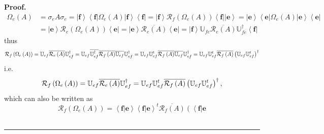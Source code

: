 \documentclass[aps,preprint]{revtex4}
\newenvironment{proof}[1][Proof]{\noindent\textbf{#1.} }{\ \rule{0.5em}{0.5em}}
\begin{document}
\begin{proof}
\begin{align}
\Omega_{e}\left( A\right) & =\sigma_{e}A\sigma_{e}=\left\vert \mathbf{f}%
\right\rangle \left\langle \mathbf{f}\right\vert \Omega_{e}\left( A\right)
\left\vert \mathbf{f}\right\rangle \left\langle \mathbf{f}\right\vert
=\left\vert \mathbf{f}\right\rangle \mathcal{R}_{f}\left( \Omega_{e}\left(
A\right) \right) \left\langle \mathbf{f}\right\vert \left\vert \mathbf{e}%
\right\rangle =\left\vert \mathbf{e}\right\rangle \left\langle \mathbf{e}%
\right\vert \Omega_{e}\left( A\right) \left\vert \mathbf{e}\right\rangle
\left\langle \mathbf{e}\right\vert \\
& =\left\vert \mathbf{e}\right\rangle \mathcal{R}_{e}\left( \Omega
_{e}\left( A\right) \right) \left\langle \mathbf{e}\right\vert =\left\vert 
\mathbf{e}\right\rangle \overline{\mathcal{R}_{e}\left( A\right) }%
\left\langle \mathbf{e}\right\vert =\left\vert \mathbf{f}\right\rangle 
\mathbb{U}_{fe}\overline{\mathcal{R}_{e}\left( A\right) }\mathbb{U}%
_{fe}^{\dagger}\left\langle \mathbf{f}\right\vert
\end{align}
thus 
\begin{equation}
\mathcal{R}_{f}\left( \Omega_{e}\left( A\right) \right) =\mathbb{U}_{ef}%
\overline{\mathcal{R}_{e}\left( A\right) }\mathbb{U}_{ef}^{\dagger }=\mathbb{%
U}_{ef}\overline{\mathbb{U}_{ef}^{\dagger}}\overline{\mathcal{R}_{f}\left(
A\right) }\overline{\mathbb{U}_{ef}}\mathbb{U}_{ef}^{\dagger }=\mathbb{U}%
_{ef}\mathbb{U}_{ef}^{t}\overline{\mathcal{R}_{f}\left( A\right) }\overline{%
\mathbb{U}_{ef}}\mathbb{U}_{ef}^{\dagger}=\mathbb{U}_{ef}\mathbb{U}_{ef}^{t}%
\overline{\mathcal{R}_{f}\left( A\right) }\left( \mathbb{U}_{ef}\mathbb{U}%
_{ef}^{t}\right) ^{\dagger}
\end{equation}
i.e. 
\begin{equation}
\mathcal{R}_{f}\left( \Omega_{e}\left( A\right) \right) =\mathbb{U}_{ef}%
\overline{\mathcal{R}_{e}\left( A\right) }\mathbb{U}_{ef}^{\dagger }=\mathbb{%
U}_{ef}\mathbb{U}_{ef}^{t}\overline{\mathcal{R}_{f}\left( A\right) }\left( 
\mathbb{U}_{ef}\mathbb{U}_{ef}^{t}\right) ^{\dagger},
\end{equation}
which can also be written as 
\begin{equation}
\mathcal{R}_{f}\left( \Omega_{e}\left( A\right) \right) =\left\langle \left. 
\mathbf{f}\right\vert \mathbf{e}\right\rangle \left\langle \left. \mathbf{f}%
\right\vert \mathbf{e}\right\rangle ^{t}\overline{\mathcal{R}_{f}\left(
A\right) }\left( \left\langle \left. \mathbf{f}\right\vert \mathbf{e}%

\end{equation}
\end{proof}
\end{document}
